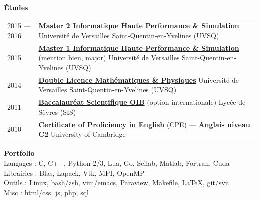 \documentclass[pdftex,a4paper,10pt]{article}
\begin{document}
{\large\bf Études}
\hrulefill\\[.3cm]
{\setlength{\extrarowheight}{.2cm}
\begin{tabularx}{\textwidth}{lX}
2015 \---- 2016 &
\href{http://mihps.prism.uvsq.fr}
{\bf Master 2 Informatique Haute Performance \& Simulation}
\newline
Université de Versailles Saint-Quentin-en-Yvelines (UVSQ) \\
2015 &
\href{http://mihps.prism.uvsq.fr}
{\bf Master 1 Informatique Haute Performance \& Simulation}
(mention bien, major)
\newline
Université de Versailles Saint-Quentin-en-Yvelines (UVSQ) \\
2014 &
\href{http://www.uvsq.fr/double-licence-mathematiques-et-physique-343617.kjsp}
{\bf Double Licence Mathématiques \& Physiques}
\newline
Université de Versailles Saint-Quentin-en-Yvelines (UVSQ) \\
2011 &
\href{http://www.education.gouv.fr/cid20999/l-option-internationale-du-baccalaureat-o.i.b.html}
{\bf Baccalauréat Scientifique OIB} (option internationale)
\newline
Lycée de Sèvres (SIS) \\
2010 &
\href{http://www.cambridgeenglish.org/exams/proficiency/}
{\bf Certificate of Proficiency in English} (CPE)
\---- {\bf Anglais niveau C2}
\newline
University of Cambridge
\end{tabularx}}
\vspace{.3cm}

{\large\bf Portfolio}
\hrulefill\\[.2cm]
Langages : C, C++, Python 2/3, Lua, Go, Scilab, Matlab, Fortran, Cuda \\
Librairies : Blas, Lapack, Vtk, MPI, OpenMP \\
Outils : Linux, bash/zsh, vim/emacs, Paraview, Makefile, \LaTeX, git/svn \\
Misc : html/css, js, php, sql
\vspace{.3cm}
\end{document}
